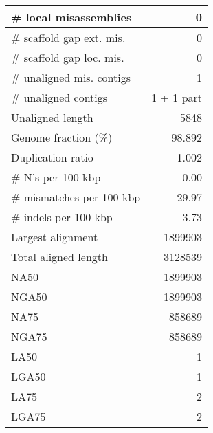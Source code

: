 \documentclass[12pt,a4paper]{article}
\begin{document}
\begin{table}[ht]
\begin{center}
\begin{tabular}{|l*{1}{|r}|}
\# local misassemblies & 0 \\ \hline
\# scaffold gap ext. mis. & 0 \\ \hline
\# scaffold gap loc. mis. & 0 \\ \hline
\# unaligned mis. contigs & 1 \\ \hline
\# unaligned contigs & 1 + 1 part \\ \hline
Unaligned length & 5848 \\ \hline
Genome fraction (\%) & 98.892 \\ \hline
Duplication ratio & 1.002 \\ \hline
\# N's per 100 kbp & 0.00 \\ \hline
\# mismatches per 100 kbp & 29.97 \\ \hline
\# indels per 100 kbp & 3.73 \\ \hline
Largest alignment & 1899903 \\ \hline
Total aligned length & 3128539 \\ \hline
NA50 & 1899903 \\ \hline
NGA50 & 1899903 \\ \hline
NA75 & 858689 \\ \hline
NGA75 & 858689 \\ \hline
LA50 & 1 \\ \hline
LGA50 & 1 \\ \hline
LA75 & 2 \\ \hline
LGA75 & 2 \\ \hline
\end{tabular}
\end{center}
\end{table}
\end{document}
